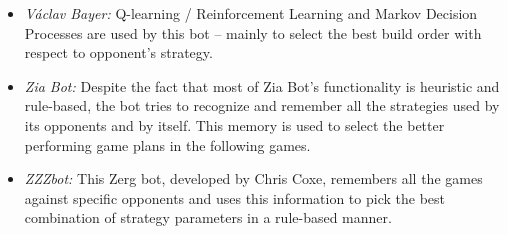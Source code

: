 \begin{itemize}
  \item {\em V\'{a}clav Bayer:} Q-learning / Reinforcement Learning and Markov Decision Processes are used by this bot -- mainly to select the best build order with respect to opponent's strategy.
  
  \item {\em Zia Bot:} Despite the fact that most of Zia Bot's functionality is heuristic and rule-based, the bot tries to recognize and remember all the strategies used by its opponents and by itself. This memory is used to select the better performing game plans in the following games.
  
  \item {\em ZZZbot:} This Zerg bot, developed by Chris Coxe, remembers all the games against specific opponents and uses this information to pick the best combination of strategy parameters in a rule-based manner.   

\end{itemize}

